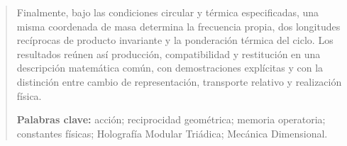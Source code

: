 \begin{abstract}
Finalmente, bajo las
condiciones circular y térmica especificadas, una misma coordenada de masa
determina la frecuencia propia, dos longitudes recíprocas de producto
invariante y la ponderación térmica del ciclo. Los resultados reúnen así
producción, compatibilidad y restitución en una descripción matemática
común, con demostraciones explícitas y con la distinción entre cambio de
representación, transporte relativo y realización física.
\par\smallskip\noindent\textbf{Palabras clave:} acción; reciprocidad geométrica; memoria operatoria; constantes físicas; Holografía Modular Triádica; Mecánica Dimensional.
\end{abstract}


\endgroup

